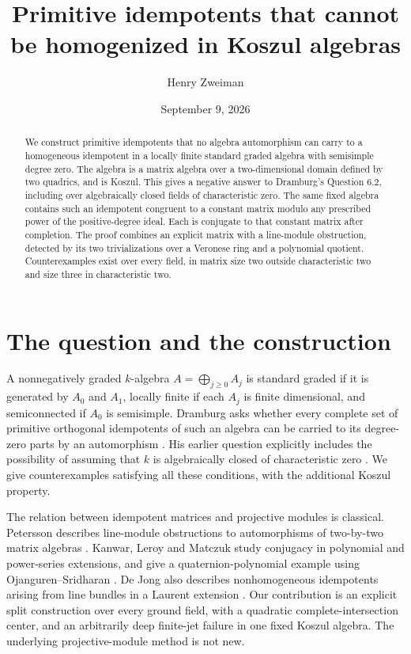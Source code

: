 \documentclass[11pt]{article}
\title{Primitive idempotents that cannot be homogenized in Koszul algebras}
\author{Henry Zweiman}
\date{September 9, 2026}
\theoremstyle{remark}
\begin{document}
\maketitle
\begin{abstract}
We construct primitive idempotents that no algebra automorphism can carry to a homogeneous idempotent in a locally finite standard graded algebra with semisimple degree zero. The algebra is a matrix algebra over a two-dimensional domain defined by two quadrics, and is Koszul. This gives a negative answer to Dramburg's Question 6.2, including over algebraically closed fields of characteristic zero. The same fixed algebra contains such an idempotent congruent to a constant matrix modulo any prescribed power of the positive-degree ideal. Each is conjugate to that constant matrix after completion. The proof combines an explicit matrix with a line-module obstruction, detected by its two trivializations over a Veronese ring and a polynomial quotient. Counterexamples exist over every field, in matrix size two outside characteristic two and size three in characteristic two.
\end{abstract}

\section{The question and the construction}

A nonnegatively graded $k$-algebra $A=\bigoplus_{j\geq0}A_j$ is standard graded if it is generated by $A_0$ and $A_1$, locally finite if each $A_j$ is finite dimensional, and semiconnected if $A_0$ is semisimple. Dramburg asks whether every complete set of primitive orthogonal idempotents of such an algebra can be carried to its degree-zero parts by an automorphism \cite[Question 6.2]{Dramburg}. His earlier question explicitly includes the possibility of assuming that $k$ is algebraically closed of characteristic zero \cite{MO}. We give counterexamples satisfying all these conditions, with the additional Koszul property.

The relation between idempotent matrices and projective modules is classical. Petersson describes line-module obstructions to automorphisms of two-by-two matrix algebras \cite[Sections 5--6]{Petersson}. Kanwar, Leroy and Matczuk study conjugacy in polynomial and power-series extensions, and give a quaternion-polynomial example using Ojanguren--Sridharan \cite[p.~9 of the author preprint]{KLM}. De Jong also describes nonhomogeneous idempotents arising from line bundles in a Laurent extension \cite{deJong}. Our contribution is an explicit split construction over every ground field, with a quadratic complete-intersection center, and an arbitrarily deep finite-jet failure in one fixed Koszul algebra. The underlying projective-module method is not new.
\end{document}
